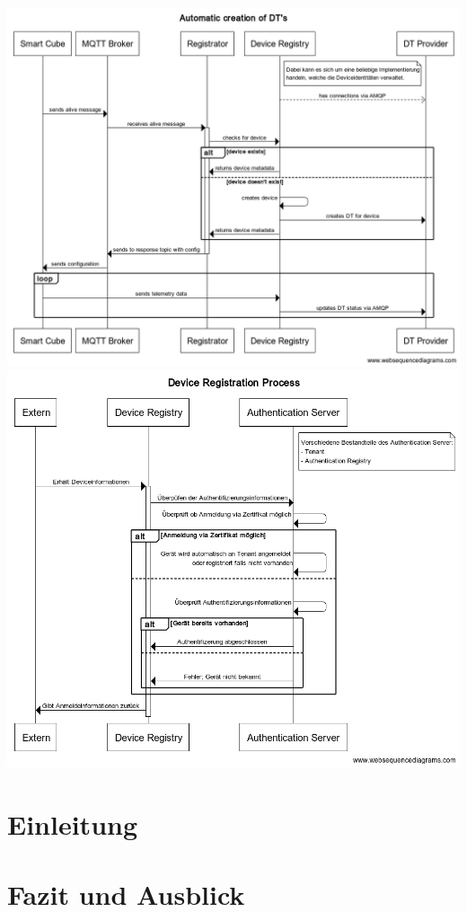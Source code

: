 \documentclass[
	12pt,
	BCOR=5mm,
	DIV=12,
	headinclude=on,
	footinclude=off,
	parskip=half,
	bibliography=totoc,
	listof=entryprefix,
	toc=listof,
	numbers=noenddot,
	plainfootsepline
]{scrreprt}
\begin{document}
\includegraphics[width=1.0\linewidth]{img/automatic_creation.png}
\includegraphics[width=1.0\linewidth]{img/device_registration.png}

\chapter{Einleitung}



\chapter{Fazit und Ausblick}

\clearpage
\ihead{}
\printbibliography[title=Literaturverzeichnis]
\cleardoublepage

\end{document}
